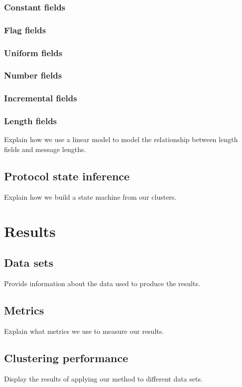 \documentclass[a4paper]{report}
\begin{document}
\subsection{Constant fields}

\subsection{Flag fields}

\subsection{Uniform fields}

\subsection{Number fields}

\subsection{Incremental fields}

\subsection{Length fields}
Explain how we use a linear model to model the relationship between length
fields and message lengths.

\section{Protocol state inference}
Explain how we build a state machine from our clusters.

\chapter{Results}

\section{Data sets}
Provide information about the data used to produce the results.

\section{Metrics}
Explain what metrics we use to measure our results.

\section{Clustering performance}
Display the results of applying our method to different data sets.
\end{document}
